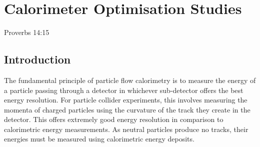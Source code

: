 \chapter{Calorimeter Optimisation Studies}
\label{chap:detopt}

{Proverbs 14:15}


\section{Introduction}
\label{sec:optimisationstudies}
The fundamental principle of particle flow calorimetry is to measure the energy of a particle passing through a detector in whichever sub-detector offers the best energy resolution.  For particle collider experiments, this involves measuring the momenta of charged particles using the curvature of the track they create in the detector.  This offers extremely good energy resolution in comparison to calorimetric energy measurements.  As neutral particles produce no tracks, their energies must be measured using calorimetric energy deposits.

